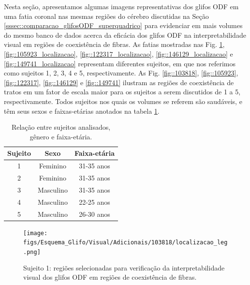 Nesta seção, apresentamos algumas imagens representativas dos glifos ODF em uma fatia coronal nas mesmas regiões do cérebro discutidas na Seção \ref{sssec::comparacao_glifosODF_superquadrico} para evidenciar em mais volumes do mesmo banco de dados acerca da eficácia dos glifos ODF na interpretabilidade visual em regiões de coexistência de fibras. As fatias mostradas nas Fig. \ref{fig::103818_localizacao}, \ref{fig::105923_localizacao}, \ref{fig::122317_localizacao}, \ref{fig::146129_localizacao} e \ref{fig::149741_localizacao} representam diferentes sujeitos, em que nos referimos como sujeitos 1, 2, 3, 4 e 5, respectivamente. As Fig. \ref{fig::103818}, \ref{fig::105923}, \ref{fig::122317}, \ref{fig::146129} e \ref{fig::149741} ilustram as regiões de coexistência de tratos em um fator de escala maior para os sujeitos a serem discutidos de 1 a 5, respectivamente. Todos sujeitos nos quais os volumes se referem são saudáveis, e têm seus sexos e faixas-etárias anotados na tabela \ref{tab::vol_id}.

\begin{table}[htb]
\centering
\begin{tabular}{|c|c|c|}
\hline
\textbf{Sujeito} & \textbf{Sexo} & \textbf{Faixa-etária} \\ \hline
1                & Feminino      & 31-35 anos            \\ \hline
2                & Feminino      & 31-35 anos            \\ \hline
3                & Masculino     & 31-35 anos            \\ \hline
4                & Masculino     & 22-25 anos            \\ \hline
5                & Masculino     & 26-30 anos            \\ \hline
\end{tabular}
\caption{Relação entre sujeitos analisados, gênero e faixa-etária.}
\label{tab::vol_id}
\end{table}




\begin{figure}[H]
     \centering
     \texttt{[image: figs/Esquema\_Glifo/Visual/Adicionais/103818/localizacao\_leg.png]}
      \caption{Sujeito 1: regiões selecionadas para verificação da interpretabilidade visual dos glifos ODF em regiões de coexistência de fibras.}
       \label{fig::103818_localizacao}
 \end{figure}

